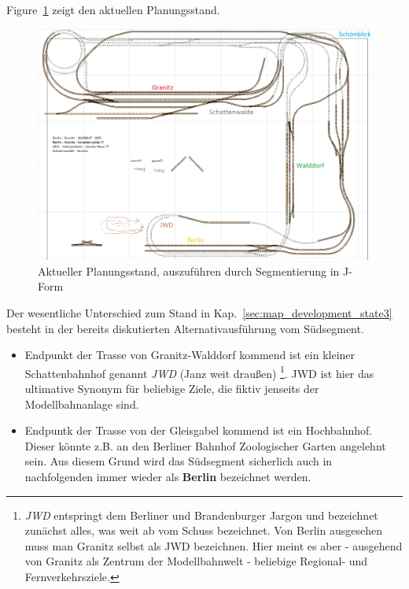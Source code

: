 Figure~\ref{img:stateDate_granitz_modules} zeigt den aktuellen Planungsstand.

\begin{figure}[h]
\centering
  \includegraphics[width=1.0\textwidth]{img/map_evolution/stateDate_granitz_modules.png}
	\caption{Aktueller Planungsstand, auszuf\"uhren durch Segmentierung in J-Form}
	\label{img:stateDate_granitz_modules}
\end{figure}

Der wesentliche Unterschied zum Stand in Kap.~\ref{sec:map_development_state3} besteht in der bereits diskutierten Alternativausf\"uhrung vom S\"udsegment.
\begin{itemize}
	\item Endpunkt der Trasse von Granitz-Walddorf kommend ist ein kleiner Schattenbahnhof genannt \textit{JWD} (Janz weit drau{\ss}en)
	\footnote{\textit{JWD} entspringt dem Berliner und Brandenburger Jargon und bezeichnet zun\"achst alles, was weit ab vom Schuss bezeichnet.
	Von Berlin ausgesehen muss man Granitz selbst als JWD bezeichnen.
	Hier meint es aber - ausgehend von Granitz als Zentrum der Modellbahnwelt - beliebige Regional- und Fernverkehrsziele.}.
	JWD ist hier das ultimative Synonym f\"ur beliebige Ziele, die fiktiv jenseits der Modellbahnanlage sind.
	\item Endpuntk der Trasse von der Gleisgabel kommend ist ein Hochbahnhof.
	Dieser k\"onnte z.B. an den Berliner Bahnhof Zoologischer Garten angelehnt sein.
	Aus diesem Grund wird das S\"udsegment sicherlich auch in nachfolgenden immer wieder als \textbf{Berlin} bezeichnet werden.
\end{itemize}

